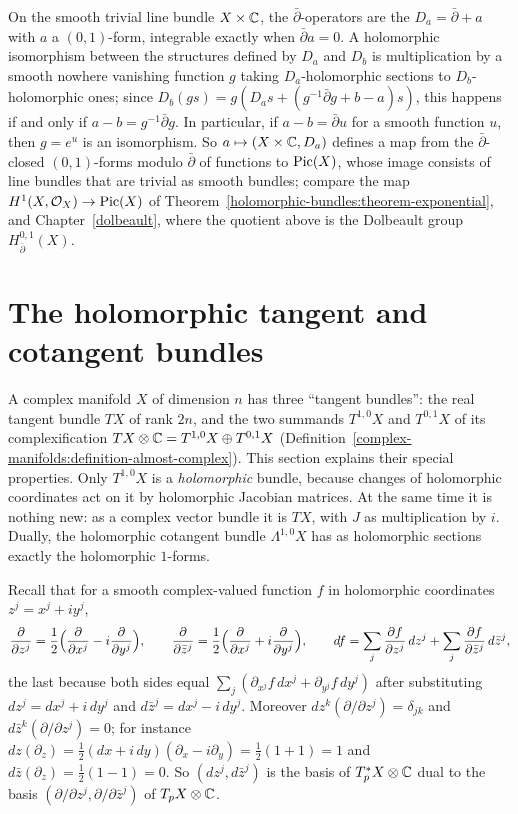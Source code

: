 \begin{example}\label{holomorphic-bundles:example-dbar-trivial-bundle}
On the smooth trivial line bundle $X \times \mathbb{C}$, the $\bar\partial$-operators are the $D_a = \bar\partial + a$ with $a$ a $(0,1)$-form, integrable exactly when $\bar\partial a = 0$. A holomorphic isomorphism between the
structures defined by $D_a$ and $D_b$ is multiplication by a smooth nowhere vanishing function $g$ taking $D_a$-holomorphic sections to $D_b$-holomorphic ones; since
$D_b(gs) = g(D_as + (g^{-1}\bar\partial g + b - a)s)$, this happens if and only if $a - b = g^{-1}\bar\partial g$. In particular, if $a - b = \bar\partial u$ for a smooth function $u$, then $g = e^u$ is an
isomorphism. So $a \mapsto (X \times \mathbb{C}, D_a)$ defines a map from the $\bar\partial$-closed $(0,1)$-forms modulo $\bar\partial$ of functions to $\operatorname{Pic}(X)$, whose image consists of line bundles that are trivial as smooth
bundles; compare the map $H^1(X, \mathcal{O}_X) \to \operatorname{Pic}(X)$ of Theorem~\ref{holomorphic-bundles:theorem-exponential}, and Chapter~\ref{dolbeault}, where the quotient above is the Dolbeault group
$H^{0,1}_{\bar\partial}(X)$.
\end{example}

\section{The holomorphic tangent and cotangent bundles}\label{holomorphic-bundles:section-tangent}

A complex manifold $X$ of dimension $n$ has three ``tangent bundles'': the real tangent bundle $TX$ of rank $2n$, and the two summands $T^{1,0}X$ and $T^{0,1}X$ of its complexification
$TX \otimes \mathbb{C} = T^{1,0}X \oplus T^{0,1}X$ (Definition~\ref{complex-manifolds:definition-almost-complex}). This section explains their special properties. Only $T^{1,0}X$ is a \emph{holomorphic} bundle, because changes of holomorphic
coordinates act on it by holomorphic Jacobian matrices. At the same time it is nothing new: as a complex vector bundle it is $TX$, with $J$ as multiplication by $i$. Dually, the holomorphic cotangent bundle
$\Lambda^{1,0}X$ has as holomorphic sections exactly the holomorphic $1$-forms.

Recall that for a smooth complex-valued function $f$ in holomorphic coordinates $z^j = x^j + iy^j$,
\[
\frac{\partial}{\partial z^j} = \frac12\Bigl(\frac{\partial}{\partial x^j} - i\frac{\partial}{\partial y^j}\Bigr), \qquad \frac{\partial}{\partial\bar z^j} = \frac12\Bigl(\frac{\partial}{\partial x^j} + i\frac{\partial}{\partial y^j}\Bigr), \qquad
df = \sum_j\frac{\partial f}{\partial z^j}\,dz^j + \sum_j\frac{\partial f}{\partial\bar z^j}\,d\bar z^j,
\]
the last because both sides equal $\sum_j(\partial_{x^j}f\,dx^j + \partial_{y^j}f\,dy^j)$ after substituting $dz^j = dx^j + i\,dy^j$ and $d\bar z^j = dx^j - i\,dy^j$. Moreover $dz^k(\partial/\partial z^j) = \delta_{jk}$ and
$d\bar z^k(\partial/\partial z^j) = 0$; for instance $dz(\partial_z) = \frac12(dx + i\,dy)(\partial_x - i\partial_y) = \frac12(1 + 1) = 1$ and $d\bar z(\partial_z) = \frac12(1 - 1) = 0$. So $(dz^j, d\bar z^j)$ is the
basis of $T^*_pX \otimes \mathbb{C}$ dual to the basis $(\partial/\partial z^j, \partial/\partial\bar z^j)$ of $T_pX \otimes \mathbb{C}$.


